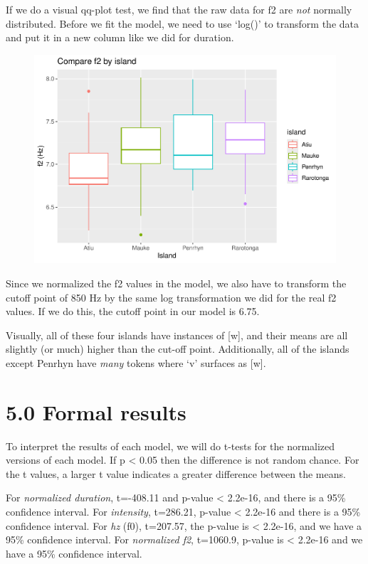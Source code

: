 \documentclass[
  ,man,floatsintext]{apa6}
\begin{document}
If we do a visual qq-plot test, we find that the raw data for f2 are \emph{not} normally distributed. Before we fit the model, we need to use `log()' to transform the data and put it in a new column like we did for duration.

\begin{figure}
\includegraphics[width=0.75\linewidth]{D1cim_w_v_manuscript_files/figure-latex/print-plot-f2-1} \caption{ }\label{fig:print-plot-f2}
\end{figure}

Since we normalized the f2 values in the model, we also have to transform the cutoff point of 850 Hz by the same log transformation we did for the real f2 values. If we do this, the cutoff point in our model is 6.75.

Visually, all of these four islands have instances of {[}w{]}, and their means are all slightly (or much) higher than the cut-off point. Additionally, all of the islands except Penrhyn have \emph{many} tokens where `v' surfaces as {[}w{]}.

\section{5.0 Formal results}\label{formal-results}

To interpret the results of each model, we will do t-tests for the normalized versions of each model. If p \textless{} 0.05 then the difference is not random chance. For the t values, a larger t value indicates a greater difference between the means.

For \emph{normalized duration}, t=-408.11 and p-value \textless{} 2.2e-16, and there is a 95\% confidence interval. For \emph{intensity}, t=286.21, p-value \textless{} 2.2e-16 and there is a 95\% confidence interval. For \emph{hz} (f0), t=207.57, the p-value is \textless{} 2.2e-16, and we have a 95\% confidence interval. For \emph{normalized f2}, t=1060.9, p-value is \textless{} 2.2e-16 and we have a 95\% confidence interval.
\end{document}
